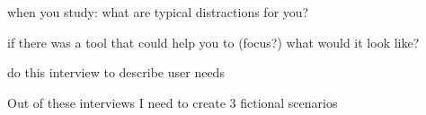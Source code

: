 

when  you study: what are  typical distractions for you?

if there was a tool that could  help you to (focus?) what would it look like?


do this  interview to describe user needs


Out of these interviews I need to create 3 fictional   scenarios

